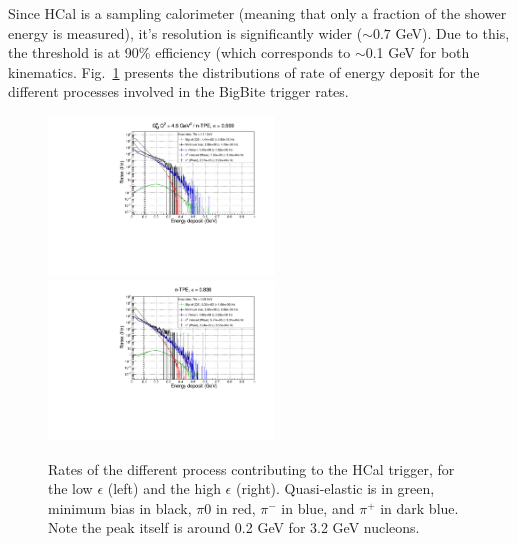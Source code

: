 Since HCal is a sampling calorimeter (meaning that only a fraction of the shower energy is measured), it's resolution is significantly wider ($\sim0.7$ GeV).
Due to this, the threshold is at 90\% efficiency (which corresponds to $\sim$0.1 GeV for both kinematics.
Fig.~\ref{fig:HCalRates} presents the distributions of rate of energy deposit for the different processes involved in the BigBite trigger rates.
\begin{figure}[h]
  \centering
    \includegraphics[width=6cm]{Plots/HCalRates_gen-tpe_le.pdf}
    \includegraphics[width=6cm]{Plots/HCalRates_gen-tpe_he.pdf}
    \caption{Rates of the different process contributing to the HCal trigger, for the low $\epsilon$ (left) and the high $\epsilon$ (right). Quasi-elastic is in green, minimum bias in black, $\pi0$ in red, $\pi^-$ in blue, and $\pi^+$ in dark blue. Note the peak itself is around 0.2 GeV for 3.2 GeV nucleons.}
    \label{fig:HCalRates}
\end{figure}

